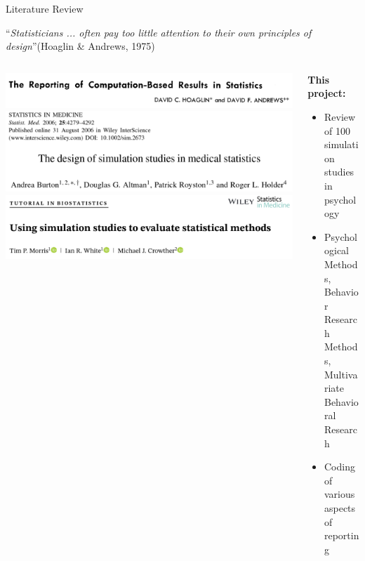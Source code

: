 \documentclass[english, 12pt, aspectratio=169]{beamer}
\begin{document}
\begin{frame}{Literature Review}
\begin{tcolorbox}[colframe=chineseBlue]
            ``\emph{Statisticians ... often pay too little attention to their own principles of design}''(Hoaglin \& Andrews, 1975)
          \end{tcolorbox}
          \vspace{-1em}
  \begin{columns}
    \begin{column}{0.5\textwidth}
      \begin{block}{}
          \centering
          \includegraphics[width = 0.8\linewidth,frame]{pics/hoaglin.png}
          \includegraphics[width = 0.8\linewidth,frame]{pics/burton.png}
          \includegraphics[width = 0.8\linewidth,frame]{pics/morris.png}
          \nocite{Hoaglin1975}
          \pause
      \end{block}
    \end{column}
    \begin{column}{0.5\textwidth}
      \begin{block}{}
      \textbf{This project:}
      \pause
        \begin{itemize}
          \item Review of \alert{100 simulation studies} in psychology
          \pause
          \item Psychological Methods, Behavior Research Methods, Multivariate Behavioral Research
          \pause
          \item Coding of various aspects of reporting
        \end{itemize}
      \end{block}
      \end{column}
    \end{columns}
\end{frame}
\end{document}
